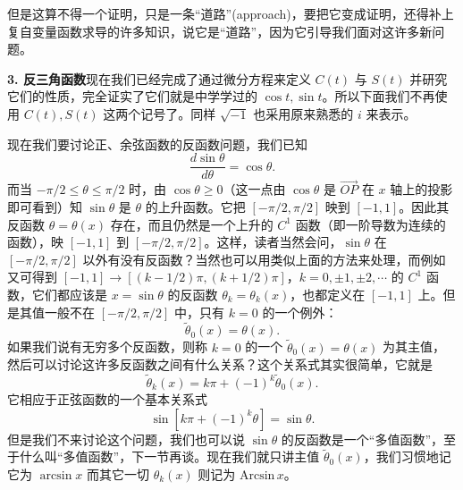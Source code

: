 但是这算不得一个证明，只是一条“道路”(approach)，要把它变成证明，还得补上复自变量函数求导的许多知识，说它是“道路”，因为它引导我们面对这许多新问题。

\textbf{3. 反三角函数}\quad 现在我们已经完成了通过微分方程来定义 $C(t)$ 与 $S(t)$ 并研究它们的性质，完全证实了它们就是中学学过的 $\cos t,\sin t$。所以下面我们不再使用 $C(t),S(t)$ 这两个记号了。同样 $\sqrt{-1}$ 也采用原来熟悉的 $i$ 来表示。

现在我们要讨论正、余弦函数的反函数问题，我们已知
\[
\frac{d\sin\theta}{d\theta}=\cos\theta. \tag{24}
\]
而当 $-\pi/2\le\theta\le\pi/2$ 时，由 $\cos\theta\ge0$（这一点由 $\cos\theta$ 是 $\overrightarrow{OP}$ 在 $x$ 轴上的投影即可看到）知 $\sin\theta$ 是 $\theta$ 的上升函数。它把 $[-\pi/2,\pi/2]$ 映到 $[-1,1]$。因此其反函数 $\theta=\theta(x)$ 存在，而且仍然是一个上升的 $C^1$ 函数（即一阶导数为连续的函数），映 $[-1,1]$ 到 $[-\pi/2,\pi/2]$。这样，读者当然会问，$\sin\theta$ 在 $[-\pi/2,\pi/2]$ 以外有没有反函数？当然也可以用类似上面的方法来处理，而例如又可得到 $[-1,1]\to[(k-1/2)\pi,(k+1/2)\pi]$，$k=0,\pm1,\pm2,\cdots$ 的 $C^1$ 函数，它们都应该是 $x=\sin\theta$ 的反函数 $\theta_k=\theta_k(x)$，也都定义在 $[-1,1]$ 上。但是其值一般不在 $[-\pi/2,\pi/2]$ 中，只有 $k=0$ 的一个例外：
\[
\widetilde\theta_0(x)=\theta(x).
\]
如果我们说有无穷多个反函数，则称 $k=0$ 的一个 $\widetilde\theta_0(x)=\theta(x)$ 为其主值，然后可以讨论这许多反函数之间有什么关系？这个关系式其实很简单，它就是
\[
\widetilde\theta_k(x)=k\pi+(-1)^k\widetilde\theta_0(x).
\]
它相应于正弦函数的一个基本关系式
\[
\sin[k\pi+(-1)^k\theta]=\sin\theta.
\]
但是我们不来讨论这个问题，我们也可以说 $\sin\theta$ 的反函数是一个“多值函数”，至于什么叫“多值函数”，下一节再谈。现在我们就只讲主值 $\widetilde\theta_0(x)$，我们习惯地记它为 $\arcsin x$ 而其它一切 $\theta_k(x)$ 则记为 $\mathrm{Arcsin}\,x$。

